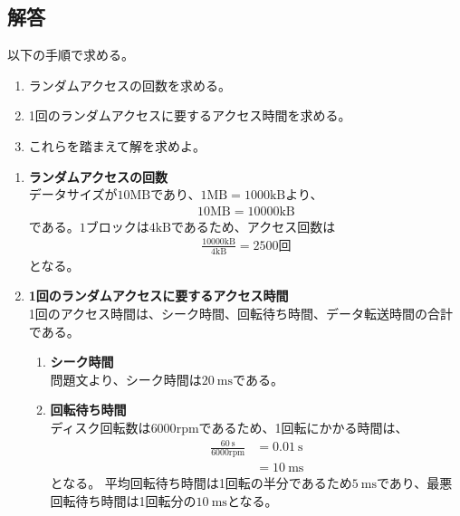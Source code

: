 \documentclass[a4paper,11pt,openany]{ltjsreport}
\begin{document}
\subsection*{解答}
以下の手順で求める。
\begin{enumerate}[label=(\arabic*)]
	\item ランダムアクセスの回数を求める。
	\item 1回のランダムアクセスに要するアクセス時間を求める。
	\item これらを踏まえて解を求めよ。
\end{enumerate}

\begin{enumerate}[label=(\arabic*)]
	\item \textbf{ランダムアクセスの回数}\\
	      データサイズが$10\mathrm{MB}$であり、$1\mathrm{MB} = 1000\mathrm{kB}$より、
	      \begin{align*}
		      10\mathrm{MB} = 10000\mathrm{kB}
	      \end{align*}
	      である。$1$ブロックは$4\mathrm{kB}$であるため、アクセス回数は
	      \begin{align*}
		      \frac{10000\mathrm{kB}}{4\mathrm{kB}} = 2500\mathrm{回}
	      \end{align*}
	      となる。

	\item \textbf{1回のランダムアクセスに要するアクセス時間}\\
	      1回のアクセス時間は、シーク時間、回転待ち時間、データ転送時間の合計である。
	      \begin{enumerate}[label=(\roman*)]
		      \item \textbf{シーク時間}\\
		            問題文より、シーク時間は$\SI{20}{\ms}$である。

		      \item \textbf{回転待ち時間}\\
		            ディスク回転数は$6000\mathrm{rpm}$であるため、1回転にかかる時間は、
		            \begin{align*}
			            \frac{\SI{60}{\s}}{6000\mathrm{rpm}} & = \SI{0.01}{\s} \\
			                                                 & = \SI{10}{\ms}
		            \end{align*}
		            となる。
		            平均回転待ち時間は1回転の半分であるため$\SI{5}{\ms}$であり、最悪回転待ち時間は1回転分の$\SI{10}{\ms}$となる。


\end{enumerate}
\end{enumerate}
\end{document}
